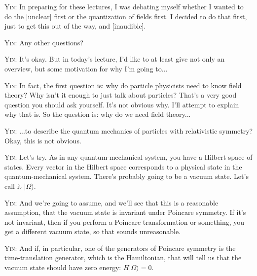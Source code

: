 \noindent\textsc{Yin:} In preparing for these lectures, I was debating myself whether I wanted to do the [unclear] first or the quantization of fields first. I decided to do that first, just to get this out of the way, and [inaudible].\par

\noindent\textsc{Yin:} Any other questions?\par

\noindent\textsc{Yin:} It's okay. But in today's lecture, I'd like to at least give not only an overview, but some motivation for why I'm going to...\par

\noindent\textsc{Yin:} In fact, the first question is: why do particle physicists need to know field theory? Why isn't it enough to just talk about particles? That's a very good question you should ask yourself. It's not obvious why. I'll attempt to explain why that is. So the question is: why do we need field theory...\par

\noindent\textsc{Yin:} ...to describe the quantum mechanics of particles with relativistic symmetry? Okay, this is not obvious.\par

\noindent\textsc{Yin:} Let's try. As in any quantum-mechanical system, you have a Hilbert space of states. Every vector in the Hilbert space corresponds to a physical state in the quantum-mechanical system. There's probably going to be a vacuum state. Let's call it $|\Omega\rangle$.\par

\noindent\textsc{Yin:} And we're going to assume, and we'll see that this is a reasonable assumption, that the vacuum state is invariant under Poincare symmetry. If it's not invariant, then if you perform a Poincare transformation or something, you get a different vacuum state, so that sounds unreasonable.\par

\noindent\textsc{Yin:} And if, in particular, one of the generators of Poincare symmetry is the time-translation generator, which is the Hamiltonian, that will tell us that the vacuum state should have zero energy: $H|\Omega\rangle=0$.\par

